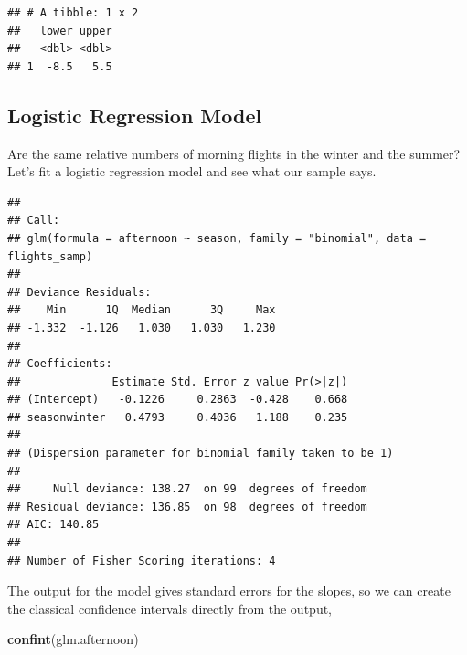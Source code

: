 \documentclass[
]{book}
\newenvironment{Shaded}{\begin{snugshade}}{\end{snugshade}}
\newcommand{\DataTypeTok}[1]{\textcolor[rgb]{0.13,0.29,0.53}{#1}}
\newcommand{\KeywordTok}[1]{\textcolor[rgb]{0.13,0.29,0.53}{\textbf{#1}}}
\newcommand{\NormalTok}[1]{#1}
\newcommand{\OperatorTok}[1]{\textcolor[rgb]{0.81,0.36,0.00}{\textbf{#1}}}
\newcommand{\StringTok}[1]{\textcolor[rgb]{0.31,0.60,0.02}{#1}}
\begin{document}
\begin{verbatim}
## # A tibble: 1 x 2
##   lower upper
##   <dbl> <dbl>
## 1  -8.5   5.5
\end{verbatim}

\hypertarget{logistic-regression-model}{%
\subsection{Logistic Regression Model}\label{logistic-regression-model}}

Are the same relative numbers of morning flights in the winter and the summer? Let's fit a logistic regression model and see what our sample says.

\begin{Shaded}
\end{Shaded}

\begin{verbatim}
## 
## Call:
## glm(formula = afternoon ~ season, family = "binomial", data = flights_samp)
## 
## Deviance Residuals: 
##    Min      1Q  Median      3Q     Max  
## -1.332  -1.126   1.030   1.030   1.230  
## 
## Coefficients:
##              Estimate Std. Error z value Pr(>|z|)
## (Intercept)   -0.1226     0.2863  -0.428    0.668
## seasonwinter   0.4793     0.4036   1.188    0.235
## 
## (Dispersion parameter for binomial family taken to be 1)
## 
##     Null deviance: 138.27  on 99  degrees of freedom
## Residual deviance: 136.85  on 98  degrees of freedom
## AIC: 140.85
## 
## Number of Fisher Scoring iterations: 4
\end{verbatim}

The output for the model gives standard errors for the slopes, so we can create the classical confidence intervals directly from the output,

\begin{Shaded}
\begin{Highlighting}[]
\KeywordTok{confint}\NormalTok{(glm.afternoon)}
\end{Highlighting}
\end{Shaded}
\end{document}
